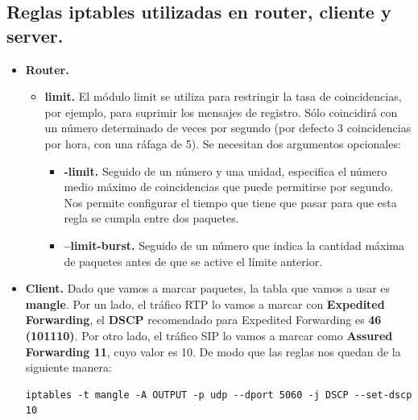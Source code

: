 \documentclass[11pt]{article}
\begin{document}
\subsection{Reglas iptables utilizadas en router, cliente y server.}
\begin{itemize}
\item \textbf{Router.}
	\begin{itemize}
	En el caso del router hemos utilizado las reglas iptables que vienen dadas en el enunciado de la práctica. Estas son:
\begin{lstlisting}[style=C,numbers=none]		
iptables -t filter -A INPUT -m dscp --dscp 14 -m limit --limit 5/s --limit-burst 5 -j ACCEPT

iptables -t filter -A INPUT -m dscp --dscp 14 -j DROP		
\end{lstlisting}
	Donde los parámetros --limit y --limit-burst significan lo siguiente.
	\item \textbf{limit.} El módulo limit se utiliza para restringir la tasa de coincidencias, por ejemplo, para suprimir los mensajes de registro. Sólo coincidirá con un número determinado de veces por segundo (por defecto 3 coincidencias por hora, con una ráfaga de 5). Se necesitan dos argumentos opcionales: 
		\begin{itemize}
			\item \textbf{-limit.} Seguido de un número y una unidad, especifica el número medio máximo de coincidencias que puede permitirse por segundo. Nos permite configurar el tiempo que tiene que pasar para que esta regla se cumpla entre dos paquetes.
			\item \textbf{--limit-burst.} Seguido de un número que indica la cantidad máxima de paquetes antes de que se active el límite anterior. \\
		\end{itemize}
	\end{itemize}
	
\item \textbf{Client.}
	Dado que vamos a marcar paquetes, la tabla que vamos a usar es \textbf{mangle}. Por un lado, el tráfico RTP lo vamos a marcar con \textbf{Expedited Forwarding}, el \textbf{DSCP} recomendado para Expedited Forwarding es \textbf{46 (101110)}. Por otro lado, el tráfico SIP lo vamos a marcar como \textbf{Assured Forwarding 11}, cuyo valor es 10. De modo que las reglas nos quedan de la siguiente manera:
\begin{lstlisting}[style=C,numbers=none]
iptables -t mangle -A OUTPUT -p udp --dport 5060 -j DSCP --set-dscp 10


\end{lstlisting}
\end{itemize}
\end{document}
